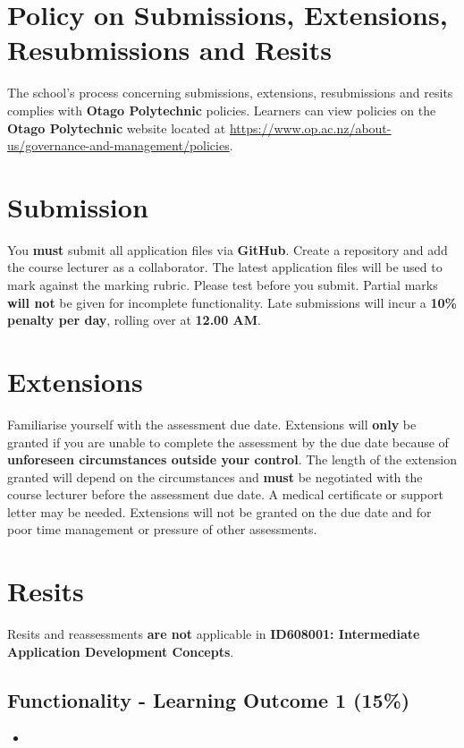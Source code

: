 \documentclass{article}
\begin{document}
	\section*{Policy on Submissions, Extensions, Resubmissions and Resits}
	The school's process concerning submissions, extensions, resubmissions and
	resits complies with \textbf{Otago Polytechnic} policies. Learners can view
	policies on the \textbf{Otago Polytechnic} website located at \href{https://www.op.ac.nz/about-us/governance-and-management/policies}{https://www.op.ac.nz/about-us/governance-and-management/policies}.

	\section*{Submission}
	You \textbf{must} submit all application files via \textbf{GitHub}. Create a
	repository and add the course lecturer as a collaborator. The latest application files will be used to mark against the marking rubric. Please test before you submit. Partial marks \textbf{will not} be given for incomplete functionality. Late submissions will incur a \textbf{10\% penalty per day}, rolling over at \textbf{12.00 AM}.

	\section*{Extensions}
	Familiarise yourself with the assessment due date. Extensions will \textbf{only}
	be granted if you are unable to complete the assessment by the due date
	because of \textbf{unforeseen circumstances outside your control}. The length
	of the extension granted will depend on the circumstances and \textbf{must} be
	negotiated with the course lecturer before the assessment due date. A medical
	certificate or support letter may be needed. Extensions will not be granted on
	the due date and for poor time management or pressure of other assessments.

	\section*{Resits}
	Resits and reassessments \textbf{are not} applicable in \textbf{ID608001: Intermediate
	Application Development Concepts}.

	\subsection*{Functionality - Learning Outcome 1 (15\%)}
	\begin{itemize}
		\item
	\end{itemize}
\end{document}
